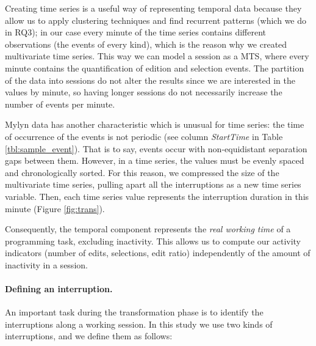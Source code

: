 \documentclass[times]{smrauth}
\newcommand\RR[1]{\textbf{Romain #1}}
\begin{document}
Creating time series is a useful way of representing temporal data because they allow us to apply clustering techniques and find recurrent patterns (which we do in RQ3); in our case every minute of the time series contains different observations (the events of every kind), which is the reason why we created multivariate time series. This way we can model a session as a MTS, where every minute contains the quantification of edition and selection events. The partition of the data into sessions do not alter the results since we are interested in the values by minute, so having longer sessions do not necessarily increase the number of events per minute.


Mylyn data has another characteristic which is unusual for time series: the time of occurrence of the events is not periodic (see column \textit{StartTime} in Table \ref{tbl:sample_event}). That is to say, events occur with non-equidistant separation gaps between them. However, in a time series, the values must be evenly spaced and chronologically sorted. For this reason, we compressed the size of the multivariate time series, pulling apart all the interruptions as a new time series variable. Then, each time series value represents the interruption duration in this minute (Figure \ref{fig:trans}). 


Consequently, the temporal component represents the \textit{real working time} of a programming task, excluding inactivity. This allows us to compute our activity indicators (number of edits, selections, edit ratio) independently of the amount of inactivity in a session.
\paragraph{Defining an interruption.} An important task during the transformation phase is to identify the interruptions along a working session. In this study we use two kinds of interruptions, and we define them as follows:
\end{document}
